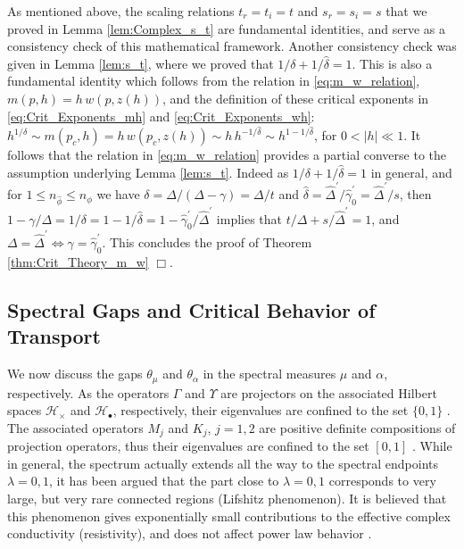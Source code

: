 \documentclass[english,12pt,jmp,graphicx]{revtex4-1}
\newcommand{\ph}{\hat{\phi}}
\newcommand{\gh}{\hat{\gamma}}
\newcommand{\Dh}{\hat{\Delta}}
\newcommand{\dha}{\hat{\delta}}
\begin{document}
As mentioned above, the scaling relations $t_r=t_i=t$ and $s_r=s_i=s$
that we proved in Lemma \ref{lem:Complex_s_t} are fundamental
identities, and serve as a consistency check of this mathematical
framework. Another consistency check was given in Lemma \ref{lem:s_t},
where we proved that $1/\delta+1/\dha=1$. This is also a fundamental
identity which follows from the relation in \eqref{eq:m_w_relation},
$m(p,h)=h\,w(p,z(h))$, and the definition of these critical exponents
in \eqref{eq:Crit_Exponents_mh} and \eqref{eq:Crit_Exponents_wh}:
$h^{1/\delta}\sim m(p_c,h)=h\,w(p_c,z(h))\sim h\,h^{-1/\dha}\sim h^{1-1/\dha}$, for
$0<|h|\ll1$. It follows that the relation in \eqref{eq:m_w_relation}
provides a partial converse to the assumption underlying Lemma 
\ref{lem:s_t}. Indeed as $1/\delta+1/\dha=1$ in
general, and for $1\leq n_{\ph}\leq n_{\phi}$ we have $\delta=\Delta/(\Delta-\gamma)=\Delta/t$ and
$\dha=\Dh^\prime/\gh_0^\prime=\Dh^\prime/s$, then $1-\gamma/\Delta=1/\delta=1-1/\dha=1-\gh_0^\prime/\Dh^\prime$ implies that 
$t/\Delta+s/\Dh^\prime=1$, and $\Delta=\Dh^\prime\iff\gamma=\gh_0^\prime$. 
%
This concludes the proof of Theorem \ref{thm:Crit_Theory_m_w} $\Box$.
%
%
\subsection{Spectral Gaps and Critical Behavior of
  Transport} \label{sec:Spectral_Gap}   
%
We now discuss the gaps $\theta_\mu$ and $\theta_\alpha$ in the spectral measures $\mu$
and $\alpha$, respectively. As
the operators $\Gamma$ and $\Upsilon$ are projectors on the associated Hilbert
spaces $\mathscr{H}_\times$ and $\mathscr{H}_\bullet$, 
respectively, their eigenvalues are confined to the set $\{0,1\}$
\cite{Reed-1980}. The associated operators $M_j$ and $K_j$,
$j=1,2$ are positive definite compositions of projection operators,
thus their eigenvalues are confined to the set $[0,1]$
\cite{Golden:CMP-473,Rudin:87}. While in general, the spectrum actually extends
all the way to the spectral endpoints $\lambda=0,1$, it has been argued that
the part close to $\lambda=0,1$ corresponds to
very large, but very rare connected regions (Lifshitz phenomenon). It
is believed that this phenomenon gives exponentially small
contributions to the effective complex conductivity (resistivity), and
does not affect power law behavior \cite{Golden:PRL-3935}.
\end{document}
